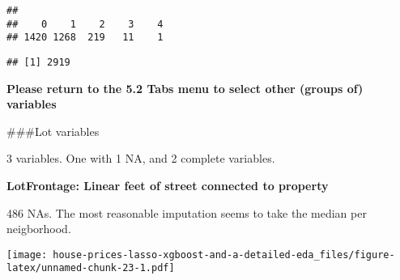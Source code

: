\documentclass[]{article}
\newenvironment{Shaded}{\begin{snugshade}}{\end{snugshade}}
\newcommand{\ControlFlowTok}[1]{\textcolor[rgb]{0.13,0.29,0.53}{\textbf{#1}}}
\newcommand{\DataTypeTok}[1]{\textcolor[rgb]{0.13,0.29,0.53}{#1}}
\newcommand{\DecValTok}[1]{\textcolor[rgb]{0.00,0.00,0.81}{#1}}
\newcommand{\KeywordTok}[1]{\textcolor[rgb]{0.13,0.29,0.53}{\textbf{#1}}}
\newcommand{\NormalTok}[1]{#1}
\newcommand{\OperatorTok}[1]{\textcolor[rgb]{0.81,0.36,0.00}{\textbf{#1}}}
\newcommand{\OtherTok}[1]{\textcolor[rgb]{0.56,0.35,0.01}{#1}}
\newcommand{\StringTok}[1]{\textcolor[rgb]{0.31,0.60,0.02}{#1}}
\begin{document}
\begin{verbatim}
## 
##    0    1    2    3    4 
## 1420 1268  219   11    1
\end{verbatim}

\begin{Shaded}
\end{Shaded}

\begin{verbatim}
## [1] 2919
\end{verbatim}

\textbf{Please return to the 5.2 Tabs menu to select other (groups of)
variables}

\#\#\#Lot variables

3 variables. One with 1 NA, and 2 complete variables.

\textbf{LotFrontage: Linear feet of street connected to property}

486 NAs. The most reasonable imputation seems to take the median per
neigborhood.

\begin{Shaded}
\end{Shaded}

\texttt{[image: house-prices-lasso-xgboost-and-a-detailed-eda\_files/figure-latex/unnamed-chunk-23-1.pdf]}

\begin{Shaded}
\end{Shaded}
\end{document}
